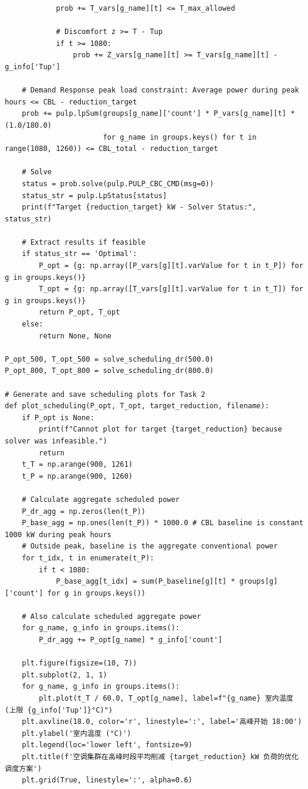 \documentclass[12pt,a4paper]{article}
\begin{document}
\begin{lstlisting}
            prob += T_vars[g_name][t] <= T_max_allowed
            
            # Discomfort z >= T - Tup
            if t >= 1080:
                prob += Z_vars[g_name][t] >= T_vars[g_name][t] - g_info['Tup']
                
    # Demand Response peak load constraint: Average power during peak hours <= CBL - reduction_target
    prob += pulp.lpSum(groups[g_name]['count'] * P_vars[g_name][t] * (1.0/180.0)
                       for g_name in groups.keys() for t in range(1080, 1260)) <= CBL_total - reduction_target
        
    # Solve
    status = prob.solve(pulp.PULP_CBC_CMD(msg=0))
    status_str = pulp.LpStatus[status]
    print(f"Target {reduction_target} kW - Solver Status:", status_str)
    
    # Extract results if feasible
    if status_str == 'Optimal':
        P_opt = {g: np.array([P_vars[g][t].varValue for t in t_P]) for g in groups.keys()}
        T_opt = {g: np.array([T_vars[g][t].varValue for t in t_T]) for g in groups.keys()}
        return P_opt, T_opt
    else:
        return None, None

P_opt_500, T_opt_500 = solve_scheduling_dr(500.0)
P_opt_800, T_opt_800 = solve_scheduling_dr(800.0)

# Generate and save scheduling plots for Task 2
def plot_scheduling(P_opt, T_opt, target_reduction, filename):
    if P_opt is None:
        print(f"Cannot plot for target {target_reduction} because solver was infeasible.")
        return
    t_T = np.arange(900, 1261)
    t_P = np.arange(900, 1260)
    
    # Calculate aggregate scheduled power
    P_dr_agg = np.zeros(len(t_P))
    P_base_agg = np.ones(len(t_P)) * 1000.0 # CBL baseline is constant 1000 kW during peak hours
    # Outside peak, baseline is the aggregate conventional power
    for t_idx, t in enumerate(t_P):
        if t < 1080:
            P_base_agg[t_idx] = sum(P_baseline[g][t] * groups[g]['count'] for g in groups.keys())
            
    # Also calculate scheduled aggregate power
    for g_name, g_info in groups.items():
        P_dr_agg += P_opt[g_name] * g_info['count']
        
    plt.figure(figsize=(10, 7))
    plt.subplot(2, 1, 1)
    for g_name, g_info in groups.items():
        plt.plot(t_T / 60.0, T_opt[g_name], label=f"{g_name} 室内温度 (上限 {g_info['Tup']}°C)")
    plt.axvline(18.0, color='r', linestyle=':', label='高峰开始 18:00')
    plt.ylabel('室内温度 (°C)')
    plt.legend(loc='lower left', fontsize=9)
    plt.title(f'空调集群在高峰时段平均削减 {target_reduction} kW 负荷的优化调度方案')
    plt.grid(True, linestyle=':', alpha=0.6)
    

\end{lstlisting}
\end{document}
